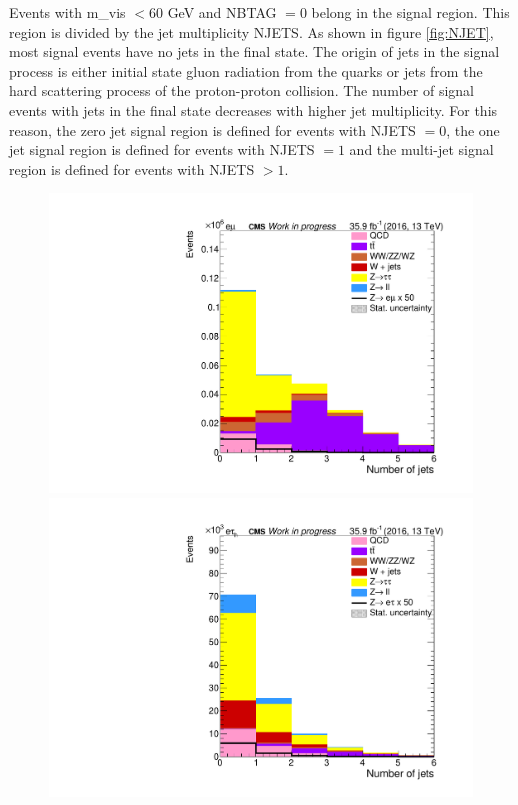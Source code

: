 Events with \gls{m_vis} $< 60$ GeV and \gls{NBTAG} $= 0$ belong in the signal region. This region is divided by the jet multiplicity \gls{NJETS}. As shown in figure \ref{fig:NJET}, most signal events have no jets in the final state. The origin of jets in the signal process is either initial state gluon radiation from the quarks or jets from the hard scattering process of the proton-proton collision. The number of signal events with jets in the final state decreases with higher jet multiplicity. For this reason, the zero jet signal region is defined for events with \gls{NJETS} $= 0$, the one jet signal region is defined for events with \gls{NJETS} $= 1$ and the multi-jet signal region is defined for events with \gls{NJETS} $> 1$. \\


\begin{figure}[htp]
	\centering
		
	\begin{multicols}{2}
		\includegraphics[width=\linewidth]{plots/em/NumberOfJets.pdf}
		\includegraphics[width=\linewidth]{plots/et/NumberOfJets.pdf}
	\end{multicols}


\end{figure}
